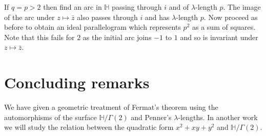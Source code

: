 \documentclass[12pt,a4paper]{amsart}
\newtheorem{thm}{Theorem}[section]
\def\HH{\mathbb{H}}
\def\xx{\HH/g2}
\def\g2{\Gamma(2)}
\def\xx{\HH/\g2}
\begin{document}
If $q=p>2$ then find an arc in $\HH$ passing through $i$ and of
$\lambda$-length $p$. The image of the arc under $z \mapsto \bar{z}$
also passes through $i$ and has $\lambda$-length $p$. Now proceed as
before to obtain an ideal parallelogram
which represents $p^2$ as a sum of squares.
Note that this fails for $2$ as the initial arc joins $-1$ to $1$
and so is invariant under $z \mapsto \bar{z}$.

\section{Concluding remarks}

We have given a geometric treatment of Fermat's theorem
using the automorphisms of the surface
$\xx$ and Penner's $\lambda$-lengths. In another work we will study
the relation between the quadratic form $x^2 +xy + y^2$ and $\xx$.

%
%
%






\end{document}
